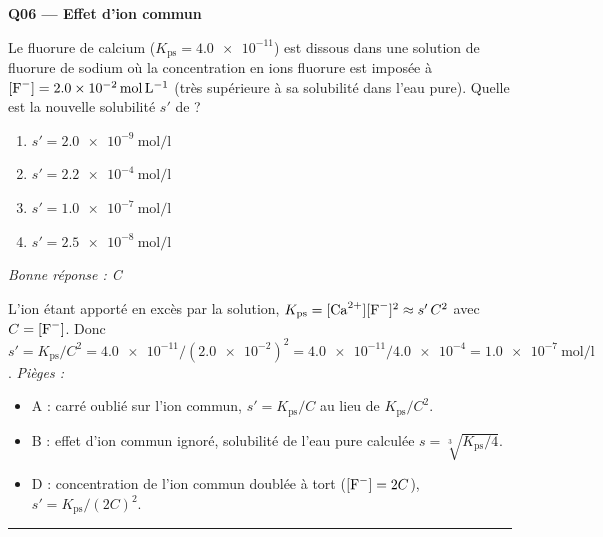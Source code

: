 \documentclass[11pt,a4paper]{article}
\begin{document}
\noindent\textbf{Q06 --- Effet d'ion commun}\par
Le fluorure de calcium  ($K_{\mathrm{ps}} = \num{4.0e-11}$) est dissous dans une solution de
fluorure de sodium où la concentration en ions fluorure est imposée à
$[\ce{F-}] = \qty{2.0e-2}{\mole\per\litre}$ (très supérieure à sa solubilité dans l'eau pure). Quelle est
la nouvelle solubilité $s'$ de  ?
\begin{enumerate}[label=\Alph*)]
\item $s' = \qty{2.0e-9}{\mole\per\litre}$
\item $s' = \qty{2.2e-4}{\mole\per\litre}$
\item $s' = \qty{1.0e-7}{\mole\per\litre}$
\item $s' = \qty{2.5e-8}{\mole\per\litre}$
\end{enumerate}
\textit{Bonne réponse : C}\par
L'ion  étant apporté en excès par la solution, $K_{\mathrm{ps}} = [\ce{Ca^{2+}}][\ce{F-}]^{2} \approx s'\,C^{2}$
avec $C = [\ce{F-}]$. Donc $s' = K_{\mathrm{ps}}/C^{2} = \num{4.0e-11}/(\num{2.0e-2})^{2} = \num{4.0e-11}/\num{4.0e-4} = \qty{1.0e-7}{\mole\per\litre}$.
\textit{Pièges :}
\begin{itemize}
\item A : carré oublié sur l'ion commun, $s' = K_{\mathrm{ps}}/C$ au lieu de $K_{\mathrm{ps}}/C^{2}$.
\item B : effet d'ion commun ignoré, solubilité de l'eau pure calculée $s = \sqrt[3]{K_{\mathrm{ps}}/4}$.
\item D : concentration de l'ion commun doublée à tort ($[\ce{F-}] = 2C$), $s' = K_{\mathrm{ps}}/(2C)^{2}$.
\end{itemize}
\vspace{6pt}\hrule\vspace{8pt}
\end{document}
